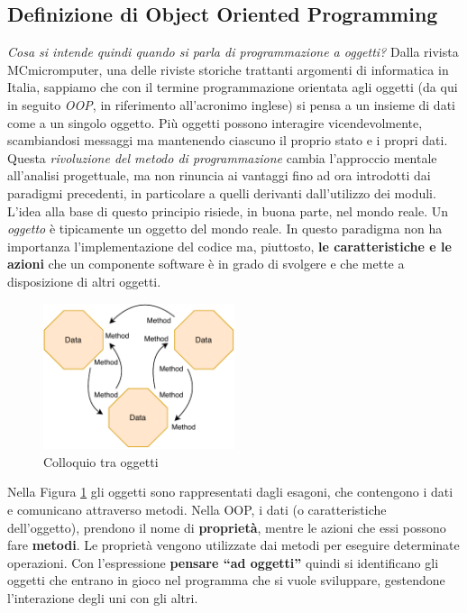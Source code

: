 \subsection{Definizione di Object Oriented Programming}
\textit{Cosa si intende quindi quando si parla di programmazione a oggetti?} Dalla rivista MCmicromputer, una delle riviste storiche trattanti argomenti di informatica in Italia, sappiamo che con il termine programmazione orientata agli oggetti (da qui in seguito \textit{OOP}, in riferimento all'acronimo inglese) si pensa a un insieme di dati come a un singolo oggetto. \cite{mcmicrocomputer:oop} Più oggetti possono interagire vicendevolmente, scambiandosi messaggi ma mantenendo ciascuno il proprio stato e i propri dati. Questa \textit{rivoluzione del metodo di programmazione} cambia l'approccio mentale all'analisi progettuale, ma non rinuncia ai vantaggi fino ad ora introdotti dai paradigmi precedenti, in particolare a quelli derivanti dall'utilizzo dei moduli. L’idea alla base di questo principio risiede, in buona parte, nel mondo reale. Un \textit{oggetto} è tipicamente un oggetto del mondo reale. In questo paradigma non ha importanza l'implementazione del codice ma, piuttosto, \textbf{le caratteristiche e le azioni} che un componente software è in grado di svolgere e che mette a disposizione di altri oggetti.  
\begin{figure}[H]
    \centering
    \includegraphics[width=0.50\textwidth]{images/01_4_object_oriented_programming.pdf}
    \caption{Colloquio tra oggetti}
    \label{fig:objectoriented-programming}
\end{figure}
Nella Figura \ref{fig:objectoriented-programming} gli oggetti sono rappresentati dagli esagoni, che contengono i dati e comunicano attraverso metodi. Nella OOP, i dati (o caratteristiche dell'oggetto), prendono il nome di \textbf{proprietà}, mentre le azioni che essi possono fare \textbf{metodi}. Le proprietà vengono utilizzate dai metodi per eseguire determinate operazioni. Con l'espressione \textbf{pensare “ad oggetti”} quindi si identificano gli oggetti che entrano in gioco nel programma che si vuole sviluppare, gestendone l’interazione degli uni con gli altri.

